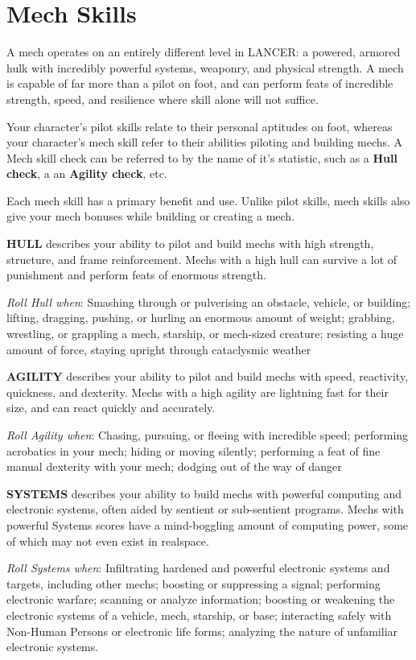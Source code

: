 \section{Mech Skills}

A mech operates on an entirely different level in LANCER: a powered, armored hulk with incredibly powerful systems, weaponry, and physical strength. A mech is capable of far more than a pilot on foot, and can perform feats of incredible strength, speed, and resilience where skill alone will not suffice.

Your character’s pilot skills relate to their personal aptitudes on foot, whereas your character’s mech skill refer to their abilities piloting and building mechs. A Mech skill check can be referred to by the name of it’s statistic, such as a \textbf{Hull check}, a an \textbf{Agility check}, etc.

Each mech skill has a primary benefit and use. Unlike pilot skills, mech skills also give your mech bonuses while building or creating a mech.

\textbf{HULL} describes your ability to pilot and build mechs with high strength, structure, and frame reinforcement. Mechs with a high hull can survive a lot of punishment and perform feats of enormous strength.

\textit{Roll Hull when}: Smashing through or pulverising an obstacle, vehicle, or building; lifting, dragging, pushing, or hurling an enormous amount of weight; grabbing, wrestling, or grappling a mech, starship, or mech-sized creature; resisting a huge amount of force, staying upright through cataclysmic weather

\textbf{AGILITY} describes your ability to pilot and build mechs with speed, reactivity, quickness, and dexterity. Mechs with a high agility are lightning fast for their size, and can react quickly and accurately.

\textit{Roll Agility when}: Chasing, pursuing, or fleeing with incredible speed; performing acrobatics in your mech; hiding or moving silently; performing a feat of fine manual dexterity with your mech; dodging out of the way of danger

\textbf{SYSTEMS} describes your ability to build mechs with powerful computing and electronic systems, often aided by sentient or sub-sentient programs. Mechs with powerful Systems scores have a mind-boggling amount of computing power, some of which may not even exist in realspace.

\textit{Roll Systems when}: Infiltrating hardened and powerful electronic systems and targets, including other mechs; boosting or suppressing a signal; performing electronic warfare; scanning or analyze information; boosting or weakening the electronic systems of a vehicle, mech, starship, or base; interacting safely with Non-Human Persons or electronic life forms; analyzing the nature of unfamiliar electronic systems. 

